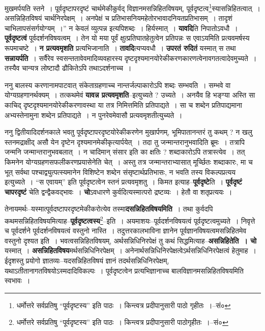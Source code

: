 \documentclass[article,12pt,a4paper]{memoir}
\begin{document}
	मुखमर्पयति स्तने । पूर्वदृष्टापरदृष्टं चार्थमेकीकुर्वद् विज्ञानमसन्निहितविषयम्, पूर्वदृष्टत्व\footnote{धर्मोत्तरे सर्वप्रतिषु “पूर्वदृष्टस्य” इति पाठः । किन्त्वत्र प्रदीपानुसारी पाठो गृहीतः ।--सं०}स्यासन्निहितत्वात् । असन्निहितविषयं चार्थनिरपेक्षम् । अनपेक्षं च प्रतिभासनियमहेतोरभावादनियतप्रतिभासम् । तादृशं चाभिलापसंसर्गयोग्यम् ।” न केवलं व्युत्पन्न इत्यपिशब्दः । हिर्यस्मात् । \textbf{यावदि}ति निपातोऽवधौ । \textbf{पूर्वदृष्टत्वं} पूर्वदर्शनविषयत्वम् । तेन यो मया पूर्वं क्षुत्प्रतिघातहेतुत्वेन प्रतिपन्नः स एवाऽयमिति प्रत्यवमर्षस्य रूपमाचष्टे । \textbf{न प्रत्यवमृशति} प्रत्यभिजानाति । \textbf{तावदि}त्यप्यवधौ । \textbf{उपरतं रुदितं} यस्मात् स तथा \textbf{सन्नायर्पति} । सर्वैरेव स्वसन्ततावेवमादिव्यवहारस्य दृष्टदृश्यमानयोरेकीकरणकारणत्वेनावगतत्वादेवमुच्यते । तस्यैव चान्यत्र लोष्टादौ ढौकितेऽपि तथाऽदर्शनाच्च ।
	\pend
      

	  \pstart ननु बालस्य करणानामपाटवात् संकेताग्रहणाच्च नान्तर्जल्पाकारोऽपि शब्दः सम्भवति । सम्भवे वा योग्यग्रहणानर्थक्यम् । तत्कथमेवं \textbf{यावन्न प्रत्यवमृशति}--इत्युच्यते ? उच्यते । अनयैव हि भङ्ग्या अस्ति सा काचिद् दृष्टदृश्यमानयोरेकीकरणावस्था या तत्र निमित्तमिति प्रतिपाद्यते । सा च शब्देन प्रतिपाद्यमाना अभ्यस्तेनामुना शब्देन प्रतिपाद्यते । न पुनरेवमेवासौ प्रत्यवमृशतीत्युच्यते ।
	\pend
      

	  \pstart ननु द्वितीयादिदर्शनकाले भवतु पूर्वदृष्टापरदृष्टयोरेकीकरणेन मुखार्पणम्, भूमिपातानन्तरं तु कथम् ? न खलु स्तनमद्राक्षीद् असौ येन दृष्टेन दृश्यमानमेकीकृत्यार्पयेत् । तदा तु जन्मान्तरानुभवादिति ब्रूमः । तत्रापि जन्मनि जन्मान्तरानुभवबलात् । न चादिमान् संसार इति का क्षतिः ? शब्दाकारोऽपि तत्रास्त्येव । तत् किमनेन योग्यग्रहणसफलीकरणप्रयासेनेति चेत् । अस्तु तत्र जन्मान्तराभ्यासात् मूर्च्छितः शब्दाकारः, मा च भूत् सर्वथा पश्चाद्व्युत्पत्स्यमानेन विशिष्टेन शब्देन संसृष्टार्थप्रतिभासः, न भवति तस्य विकल्पप्रत्यय इत्युच्यते । “स एवायम्” इति पूर्वदृष्टत्वेन स्तनं प्रत्यवमृशतु । किमत इत्याह--\textbf{पूर्वदृष्टे}ति । \textbf{पूर्वदृष्टं चापरदृष्टं} चेति द्वन्द्वैकवद्भावः । \textbf{चो}ऽवधारणे कुर्वदित्यस्मात्परो द्रष्टव्यः । हेतौ वा शतृप्रत्ययः ।
	\pend
      

	  \pstart तेनायमर्थः--यस्मात्पूर्वदष्टापरदृष्टमेकीकरोत्येव तस्मा\textbf{दसन्निहितविषयमिति} । तथा कुर्वदपि कथमसन्निहितविषयमित्याह--\textbf{पूर्वदृष्टत्वस्य}\footnote{धर्मोत्तरे सर्वप्रतिषु “पूर्वदृष्टस्य” इति पाठः । किन्त्वत्र प्रदीपानुसारी पाठोगृहीतः ।--सं०}--इति । अयमाशयः--पूर्वदर्शनविषयत्वं पूर्वदृष्टत्वमुच्यते । निवृत्ते च पूर्वदर्शने पूर्वदर्शनविषयत्वं वस्तुनो नास्ति । तदुत्तरकालभाविना ज्ञानेन पूर्वज्ञानविष\leavevmode{}यत्वमसन्निहितमेव वस्तुनो दृश्यत इति । भवत्वसन्निहितविषयम्, अर्थसन्निधिनिरपेक्षं तु कथं सिद्धमित्याह--\textbf{असन्निहितेति । चो} यस्मात् । \textbf{असन्निहितविषय}मर्थसन्निधिनिरपेक्षम् । अनेनार्थसन्निधिनिरपेक्षत्वेऽर्थसन्निधिनिरपेक्षत्वं हेतुमाह । ईदृशस्तु प्रयोगो ज्ञातव्यः--यदसन्निहितविषयं ज्ञानं तदर्थसन्निधिनिरपेक्षम्, यथाऽतीतानागतविषयोऽस्मदादिविकल्पः । पूर्वदृष्टत्वेन प्रत्यभिज्ञानाच्च बालविज्ञानमसन्निहितविषयमिति स्वभावः ।
	\pend
      
\end{document}
